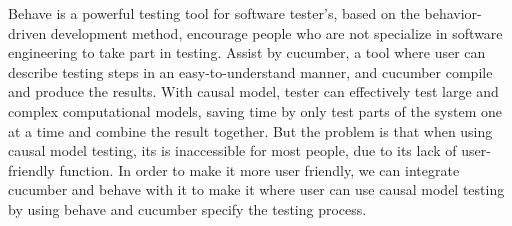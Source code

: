 Behave is a powerful testing tool for software tester’s, based on the behavior-driven development method, encourage people who are not specialize in software engineering to take part in testing. Assist by cucumber, a tool where user can describe testing steps in an easy-to-understand manner, and cucumber compile and produce the results. With causal model, tester can effectively test large and complex computational models, saving time by only test parts of the system one at a time and combine the result together. But the problem is that when using causal model testing, its is inaccessible for most people, due to its lack of user-friendly function. In order to make it more user friendly, we can integrate cucumber and behave with it to make it where user can use causal model testing by using behave and cucumber specify the testing process.
